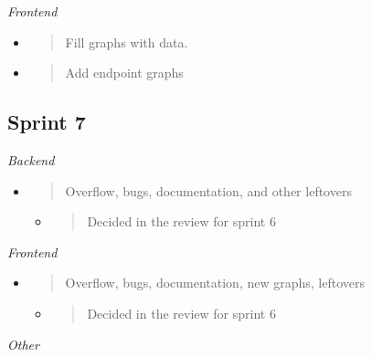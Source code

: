 \emph{Frontend}

\begin{itemize}
\item
  \begin{quote}
  Fill graphs with data.
  \end{quote}
\item
  \begin{quote}
  Add endpoint graphs
  \end{quote}
\end{itemize}

\hypertarget{sprint-7}{%
\subsection{Sprint 7}\label{sprint-7}}

\emph{Backend}

\begin{itemize}
\item
  \begin{quote}
  Overflow, bugs, documentation, and other leftovers
  \end{quote}

  \begin{itemize}
  \item
    \begin{quote}
    Decided in the review for sprint 6
    \end{quote}
  \end{itemize}
\end{itemize}

\emph{Frontend}

\begin{itemize}
\item
  \begin{quote}
  Overflow, bugs, documentation, new graphs, leftovers
  \end{quote}

  \begin{itemize}
  \item
    \begin{quote}
    Decided in the review for sprint 6
    \end{quote}
  \end{itemize}
\end{itemize}

\emph{Other}

